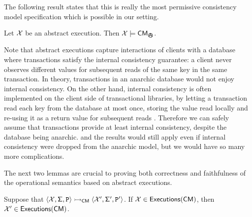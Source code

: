 The following result states that this is really the most permissive consistency model specification which is 
possible in our setting. 
\begin{proposition}
Let $\mathcal{X}$ be an abstract execution. Then $\aexec \models \CM_{\anarchicsmall}$.
\end{proposition}

Note that abstract executions capture interactions of clients with a database where 
transactions satisfy the
internal consistency guarantee: a client never observes different values for subsequent 
reads of the same key in the same transaction. In theory, transactions in an anarchic database 
would not enjoy internal consistency. On the other hand, internal consistency is often implemented 
on the client side of transactional libraries, by letting a transaction read each key from the database 
at most once, storing the value read locally and re-using it as a return value for subsequent reads 
\cite{jessy,physicsNMSI}. Therefore we can safely assume that transactions provide at least internal 
consistency, despite the database being anarchic. \ac{and the results would still apply even if 
internal consistency were dropped from the anarchic model, but we would have so many more 
complications.}

The next two lemmas are crucial to proving both correctness and faithfulness of the operational 
semantics based on abstract executions.

\begin{lemma}
\label{lem:subj.red}
Suppose that $\langle \mathcal{X}, \mathsf{\Sigma}, \texttt{P} \rangle \rightarrowtail_{\mathsf{CM}} \langle \mathcal{X}', \mathsf{\Sigma}', \texttt{P}' \rangle$. 
If $\mathcal{X} \in {\mathsf{Executions}}(\mathsf{CM})$, then $\mathcal{X}' \in {\mathsf{Executions}}(\mathsf{CM})$.
\end{lemma}

